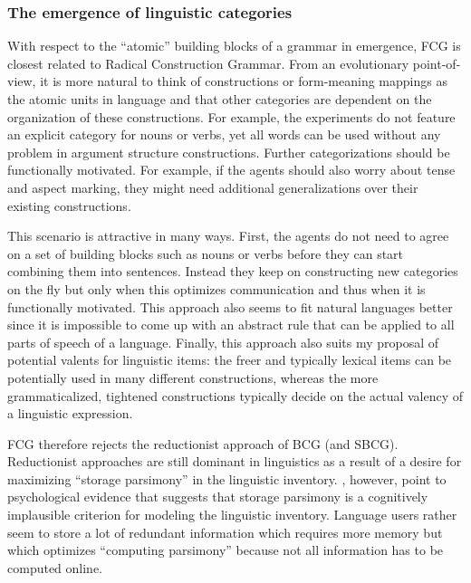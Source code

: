 \subsubsection{The emergence of linguistic categories}
With respect to the ``atomic'' building blocks of a grammar in emergence, FCG is closest related to Radical Construction Grammar. From an evolutionary point-of-view, it is more natural to think of constructions or form-meaning mappings as the atomic units in language and that other categories are dependent on the organization of these constructions. For example, the experiments do not feature an explicit category for nouns or verbs, yet all words can be used without any problem in argument structure constructions. Further categorizations should be functionally motivated. For example, if the agents should also worry about tense and aspect marking, they might need additional generalizations over their existing constructions.

This scenario is attractive in many ways. First, the agents do not need to agree on a set of building blocks such as nouns or verbs before they can start combining them into sentences. Instead they keep on constructing new categories on the fly but only when this optimizes communication and thus when it is functionally motivated. This approach also seems to fit natural languages better since it is impossible to come up with an abstract rule that can be applied to all parts of speech of a language. Finally, this approach also suits my proposal of potential valents for linguistic items: the freer and typically lexical items can be potentially used in many different constructions, whereas the more grammaticalized, tightened constructions typically decide on the actual valency of a linguistic expression.

FCG therefore rejects the reductionist approach of BCG (and SBCG). Reductionist approaches are still dominant in linguistics as a result of a desire for maximizing ``storage parsimony'' in the linguistic inventory. \citet[p. 278]{croft04cognitive}, however, point to psychological evidence that suggests that storage parsimony is a cognitively implausible criterion for modeling the linguistic inventory. Language users rather seem to store a lot of redundant information which requires more memory but which optimizes  ``computing parsimony'' because not all information has to be computed online.


